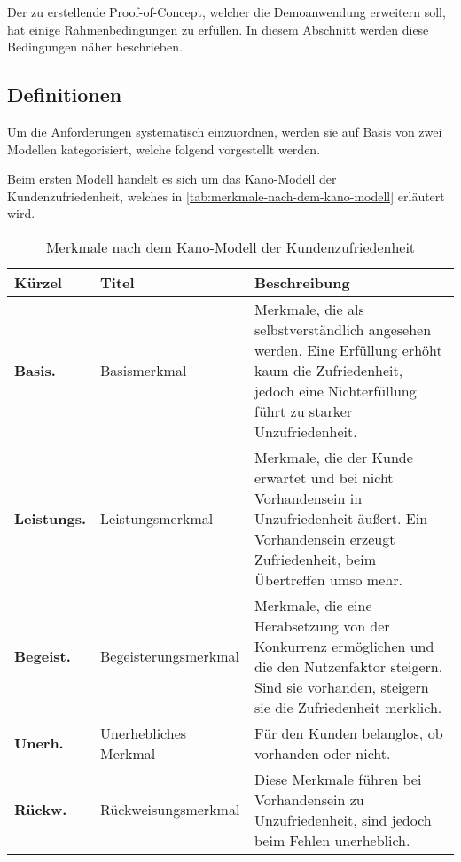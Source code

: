
Der zu erstellende Proof-of-Concept, welcher die Demoanwendung erweitern soll, hat einige Rahmenbedingungen zu erfüllen. In diesem Abschnitt werden diese Bedingungen näher beschrieben.
	
\subsection{Definitionen}
	
Um die Anforderungen systematisch einzuordnen, werden sie auf Basis von zwei Modellen kategorisiert, welche folgend vorgestellt werden.

Beim ersten Modell handelt es sich um das Kano-Modell \cite{KanoModell} der Kundenzufriedenheit, welches in  \autoref{tab:merkmale-nach-dem-kano-modell} erläutert wird.

\begin{table}[H]
\begin{tabular}{ |p{1.75cm}|p{2.40cm}|p{9.25cm}| }
	\hline
	Kürzel & Titel & Beschreibung \\
	\hline
	\textbf{Basis.} & Basis\-merkmal & Merkmale, die als selbstverständlich angesehen werden. Eine Erfüllung erhöht kaum die Zufriedenheit, jedoch eine Nichterfüllung führt zu starker Unzufriedenheit. \\
	\hline
	\textbf{Leistungs.} & Leistungs\-merkmal & Merkmale, die der Kunde erwartet und bei nicht Vorhandensein in Unzufriedenheit äußert. Ein Vorhandensein erzeugt Zufriedenheit, beim Übertreffen umso mehr. \\
	\hline
	\textbf{Begeist.} & Begeisterungs\-merkmal & Merkmale, die eine Herabsetzung von der Konkurrenz ermöglichen und die den Nutzenfaktor steigern. Sind sie vorhanden, steigern sie die Zufriedenheit merklich. \\
	\hline
	\textbf{Unerh.} & Unerhebliches Merkmal & Für den Kunden belanglos, ob vorhanden oder nicht. \\
	\hline
	\textbf{Rückw.} & Rückweisungs\-merkmal & Diese Merkmale führen bei Vorhandensein zu Unzufriedenheit, sind jedoch beim Fehlen unerheblich. \\
	\hline
\end{tabular}
 \captionsetup{justification=centering}
  \caption{Merkmale nach dem Kano-Modell der Kundenzufriedenheit \cite{KanoModell}}
   \label{tab:merkmale-nach-dem-kano-modell}
\end{table}

